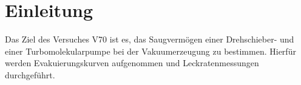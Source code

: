 \section{Einleitung}
\label{sec:einleitung}
Das Ziel des Versuches V70 ist es, das Saugvermögen einer Drehschieber- und einer
Turbomolekularpumpe bei der Vakuumerzeugung zu bestimmen. Hierfür werden Evakuierungskurven
aufgenommen und Leckratenmessungen durchgeführt.
